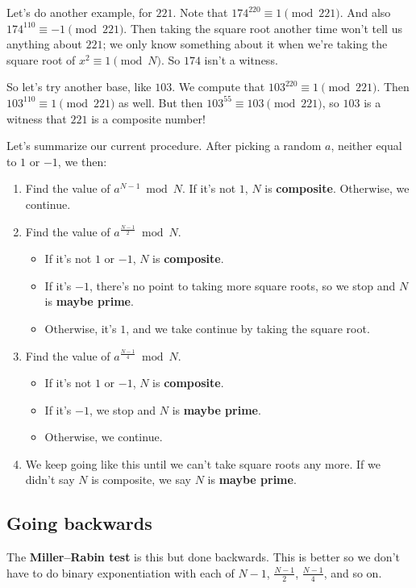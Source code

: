 \documentclass[11pt,paper=letter]{scrartcl}
\begin{document}
Let's do another example, for $221$. Note that $174^{220} \equiv 1 \pmod{221}$. And also $174^{110} \equiv -1 \pmod{221}$. Then taking the square root another time won't tell us anything about $221$; we only know something about it when we're taking the square root of $x^2 \equiv 1 \pmod N$. So $174$ isn't a witness.

So let's try another base, like $103$. We compute that $103^{220} \equiv 1 \pmod{221}$. Then $103^{110} \equiv 1 \pmod{221}$ as well. But then $103^{55} \equiv 103 \pmod{221}$, so $103$ is a witness that $221$ is a composite number!

Let's summarize our current procedure. After picking a random $a$, neither equal to $1$ or $-1$, we then:

\begin{enumerate}
  \item Find the value of $a^{N-1} \bmod N$. If it's not $1$, $N$ is \textbf{composite}. Otherwise, we continue.
  \item Find the value of $a^{\frac{N-1}2} \bmod N$.
  \begin{itemize}
    \item If it's not $1$ or $-1$, $N$ is \textbf{composite}.
    \item If it's $-1$, there's no point to taking more square roots, so we stop and $N$ is \textbf{maybe prime}.
    \item Otherwise, it's $1$, and we take continue by taking the square root.
  \end{itemize}
  \item Find the value of $a^{\frac{N-1}4} \bmod N$.
  \begin{itemize}
    \item If it's not $1$ or $-1$, $N$ is \textbf{composite}.
    \item If it's $-1$, we stop and $N$ is \textbf{maybe prime}.
    \item Otherwise, we continue.
  \end{itemize}
  \item We keep going like this until we can't take square roots any more. If we didn't say $N$ is composite, we say $N$ is \textbf{maybe prime}.
\end{enumerate}

\subsection{Going backwards}

The \textbf{Miller--Rabin test} is this but done backwards. This is better so we don't have to do binary exponentiation with each of $N-1$, $\frac{N-1}2$, $\frac{N-1}4$, and so on.
\end{document}
